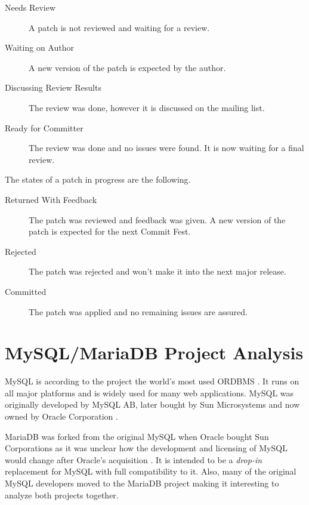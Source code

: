 \begin{description}

  \item[Needs Review] A patch is not reviewed and waiting for a review.

  \item[Waiting on Author] A new version of the patch is expected by the
    author.

  \item[Discussing Review Results] The review was done, however it is
    discussed on the mailing list.

  \item[Ready for Committer] The review was done and no issues were
    found. It is now waiting for a final review.

\end{description}

\noindent The states of a patch in progress are the following.

\begin{description}

  \item[Returned With Feedback] The patch was reviewed and feedback was
    given. A new version of the patch is expected for the next Commit Fest.

  \item[Rejected] The patch was rejected and won't make it into the next
    major release.

  \item[Committed] The patch was applied and no remaining issues are
    assured.

\end{description}


\section{MySQL/MariaDB Project Analysis} %


MySQL is according to the project the world's most used \ac{ORDBMS}
\cite{MySQLSun}. It runs on all major platforms and is widely used for many web
applications. MySQL was originally developed by MySQL AB, later bought by Sun
Microsystems and now owned by Oracle Corporation
\cite{MySQLSun,MySQLOracle,MySQLHistory}.

MariaDB was forked from the original MySQL when Oracle bought Sun Corporations
as it was unclear how the development and licensing of MySQL would change after
Oracle's acquisition \cite{MySQLAbout,MySQLBehind}. It is intended to be a
\emph{drop-in} replacement for MySQL with full compatibility to it. Also, many
of the original MySQL developers moved to the MariaDB project making it
interesting to analyze both projects together.

